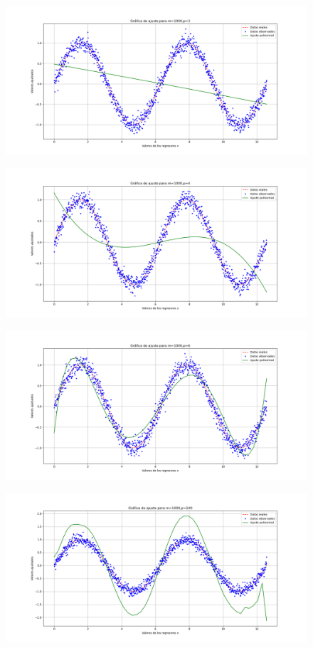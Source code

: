 \documentclass[letterpaper]{article}
\newcommand{\1}{\mathds{1}}
\theoremstyle{definition}
\theoremstyle{definition}
\theoremstyle{definition}
\theoremstyle{definition}
\theoremstyle{definition}
\begin{document}
\begin{enumerate}
\begin{figure}[h]
        \caption{}
    \end{figure}  
    \begin{figure}[h]
        \centering
        \includegraphics[width=0.7\linewidth]{5.png}
        \caption{}
    \end{figure}  
    \begin{figure}[h]
        \centering
        \includegraphics[width=0.7\linewidth]{6.png}
        \caption{}
    \end{figure}  
    \begin{figure}[h]
        \centering
        \includegraphics[width=0.7\linewidth]{7.png}
        \caption{}
    \end{figure}  
    \begin{figure}[h]
        \centering
        \includegraphics[width=0.7\linewidth]{8.png}

\end{figure}
\end{enumerate}
\end{document}
